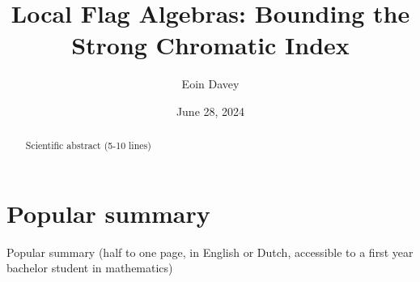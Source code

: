 \documentclass{uvamath}
\title{Local Flag Algebras: Bounding the Strong Chromatic Index} %
\author[eoin.davey@student.uva.nl, 14246287]{Eoin Davey} %
\date{June 28, 2024} %
\begin{document}
\maketitle

\begin{abstract}
Scientific abstract (5-10 lines)
\end{abstract}

\tableofcontents





\chapter*{Popular summary}
Popular summary (half to one page, in English or Dutch, accessible to a first year bachelor student in mathematics)

\printbibliography{}
\end{document}
